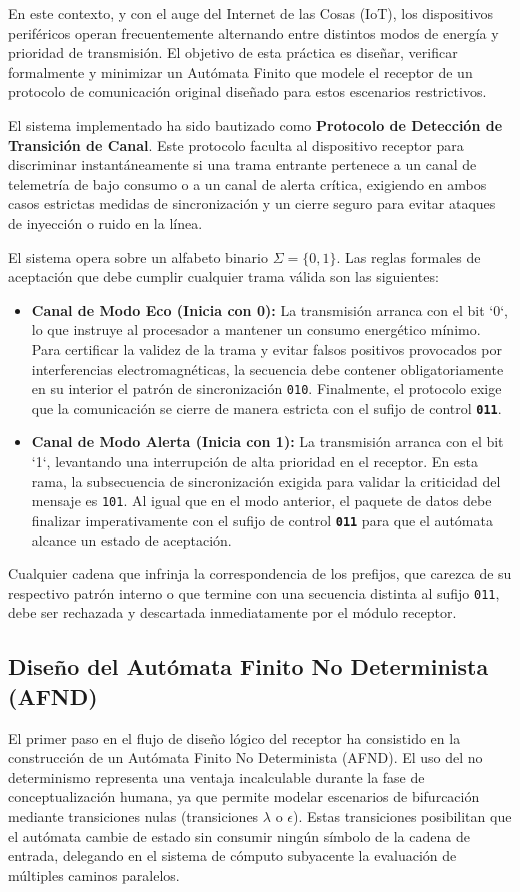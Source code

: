 \documentclass[12pt,a4paper]{article}
\begin{document}
En este contexto, y con el auge del Internet de las Cosas (IoT), los dispositivos periféricos operan frecuentemente alternando entre distintos modos de energía y prioridad de transmisión. El objetivo de esta práctica es diseñar, verificar formalmente y minimizar un Autómata Finito que modele el receptor de un protocolo de comunicación original diseñado para estos escenarios restrictivos. 

El sistema implementado ha sido bautizado como \textbf{Protocolo de Detección de Transición de Canal}. Este protocolo faculta al dispositivo receptor para discriminar instantáneamente si una trama entrante pertenece a un canal de telemetría de bajo consumo o a un canal de alerta crítica, exigiendo en ambos casos estrictas medidas de sincronización y un cierre seguro para evitar ataques de inyección o ruido en la línea.

El sistema opera sobre un alfabeto binario $\Sigma = \{0, 1\}$. Las reglas formales de aceptación que debe cumplir cualquier trama válida son las siguientes:
\begin{itemize}
    \item \textbf{Canal de Modo Eco (Inicia con 0):} La transmisión arranca con el bit `0`, lo que instruye al procesador a mantener un consumo energético mínimo. Para certificar la validez de la trama y evitar falsos positivos provocados por interferencias electromagnéticas, la secuencia debe contener obligatoriamente en su interior el patrón de sincronización \texttt{010}. Finalmente, el protocolo exige que la comunicación se cierre de manera estricta con el sufijo de control \textbf{\texttt{011}}.
    \item \textbf{Canal de Modo Alerta (Inicia con 1):} La transmisión arranca con el bit `1`, levantando una interrupción de alta prioridad en el receptor. En esta rama, la subsecuencia de sincronización exigida para validar la criticidad del mensaje es \texttt{101}. Al igual que en el modo anterior, el paquete de datos debe finalizar imperativamente con el sufijo de control \textbf{\texttt{011}} para que el autómata alcance un estado de aceptación.
\end{itemize}
Cualquier cadena que infrinja la correspondencia de los prefijos, que carezca de su respectivo patrón interno o que termine con una secuencia distinta al sufijo \texttt{011}, debe ser rechazada y descartada inmediatamente por el módulo receptor.

\subsection{Diseño del Autómata Finito No Determinista (AFND)}
El primer paso en el flujo de diseño lógico del receptor ha consistido en la construcción de un Autómata Finito No Determinista (AFND). El uso del no determinismo representa una ventaja incalculable durante la fase de conceptualización humana, ya que permite modelar escenarios de bifurcación mediante transiciones nulas (transiciones $\lambda$ o $\epsilon$). Estas transiciones posibilitan que el autómata cambie de estado sin consumir ningún símbolo de la cadena de entrada, delegando en el sistema de cómputo subyacente la evaluación de múltiples caminos paralelos.
\end{document}
